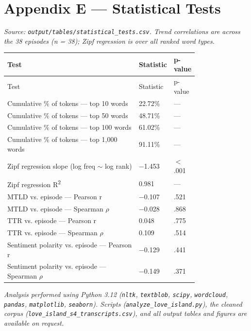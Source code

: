 \documentclass[11pt]{article}
\begin{document}
\section*{Appendix E --- Statistical Tests}

\emph{Source: \texttt{output/tables/statistical\_tests.csv}. Trend correlations are across the 38 episodes (n = 38); Zipf regression is over all ranked word types.}

\begin{longtable}{p{0.78\linewidth}ll}
\toprule
Test & Statistic & p-value \\
\midrule
\endfirsthead
\toprule
Test & Statistic & p-value \\
\midrule
\endhead
\bottomrule
\endlastfoot
Cumulative \% of tokens --- top 10 words & 22.72\% & --- \\
Cumulative \% of tokens --- top 50 words & 48.71\% & --- \\
Cumulative \% of tokens --- top 100 words & 61.02\% & --- \\
Cumulative \% of tokens --- top 1,000 words & 91.11\% & --- \\
Zipf regression slope (log freq $\sim$ log rank) & $-$1.453 & $<$ .001 \\
Zipf regression R\textsuperscript{2} & 0.981 & --- \\
MTLD vs. episode --- Pearson r & $-$0.107 & .521 \\
MTLD vs. episode --- Spearman $\rho$ & $-$0.028 & .868 \\
TTR vs. episode --- Pearson r & 0.048 & .775 \\
TTR vs. episode --- Spearman $\rho$ & 0.109 & .514 \\
Sentiment polarity vs. episode --- Pearson r & $-$0.129 & .441 \\
Sentiment polarity vs. episode --- Spearman $\rho$ & $-$0.149 & .371 \\
\end{longtable}


\emph{Analysis performed using Python 3.12 (\texttt{nltk}, \texttt{textblob}, \texttt{scipy}, \texttt{wordcloud}, \texttt{pandas}, \texttt{matplotlib}, \texttt{seaborn}). Scripts (\texttt{analyze\_love\_island.py}), the cleaned corpus (\texttt{love\_island\_s4\_transcripts.csv}), and all output tables and figures are available on request.}
\end{document}
